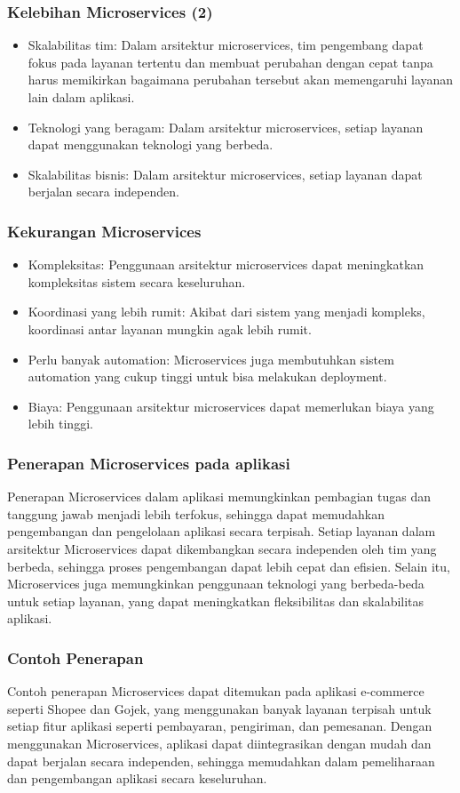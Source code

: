 \documentclass[aspectratio=169, table]{beamer}
\begin{document}
	\begin{frame}
		\frametitle{Kelebihan Microservices (2)}
	
		\begin{itemize}
		
			\item Skalabilitas tim: Dalam arsitektur microservices, tim pengembang dapat fokus pada layanan tertentu dan membuat perubahan dengan cepat tanpa harus memikirkan bagaimana perubahan tersebut akan memengaruhi layanan lain dalam aplikasi.
			\item Teknologi yang beragam: Dalam arsitektur microservices, setiap layanan dapat menggunakan teknologi yang berbeda.
			\item Skalabilitas bisnis: Dalam arsitektur microservices, setiap layanan dapat berjalan secara independen.
		\end{itemize}
	\end{frame}
	
	\begin{frame}
		\frametitle{Kekurangan Microservices}
		\begin{itemize}
			\item Kompleksitas: Penggunaan arsitektur microservices dapat meningkatkan kompleksitas sistem secara keseluruhan.
			\item Koordinasi yang lebih rumit: Akibat dari sistem yang menjadi kompleks, koordinasi antar layanan mungkin agak lebih rumit.
			\item Perlu banyak automation: Microservices juga membutuhkan sistem automation yang cukup tinggi untuk bisa melakukan deployment.
			\item Biaya: Penggunaan arsitektur microservices dapat memerlukan biaya yang lebih tinggi.
		\end{itemize}
	\end{frame}
	
	\begin{frame}
		\frametitle{Penerapan Microservices pada aplikasi}
		Penerapan Microservices dalam aplikasi memungkinkan pembagian tugas dan tanggung jawab menjadi lebih terfokus, sehingga dapat memudahkan pengembangan dan pengelolaan aplikasi secara terpisah. Setiap layanan dalam arsitektur Microservices dapat dikembangkan secara independen oleh tim yang berbeda, sehingga proses pengembangan dapat lebih cepat dan efisien. Selain itu, Microservices juga memungkinkan penggunaan teknologi yang berbeda-beda untuk setiap layanan, yang dapat meningkatkan fleksibilitas dan skalabilitas aplikasi.
	\end{frame}
	
	\begin{frame}
		\frametitle{Contoh Penerapan}
		Contoh penerapan Microservices dapat ditemukan pada aplikasi e-commerce seperti Shopee dan Gojek, yang menggunakan banyak layanan terpisah untuk setiap fitur aplikasi seperti pembayaran, pengiriman, dan pemesanan. Dengan menggunakan Microservices, aplikasi dapat diintegrasikan dengan mudah dan dapat berjalan secara independen, sehingga memudahkan dalam pemeliharaan dan pengembangan aplikasi secara keseluruhan.
	\end{frame}
	
\end{document}
